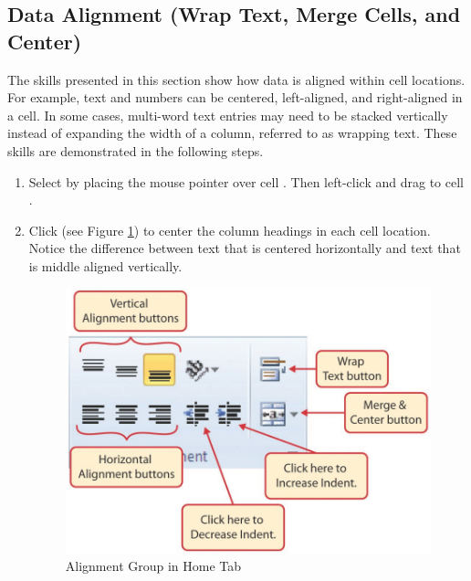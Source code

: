 \subsection{Data Alignment (Wrap Text, Merge Cells, and Center)}

The skills presented in this section show how data is aligned within cell locations. For example, text and numbers can be centered, left-aligned, and right-aligned in a cell. In some cases, multi-word text entries may need to be stacked vertically instead of expanding the width of a column, referred to as wrapping text. These skills are demonstrated in the following steps.

\begin{enumbox}
	\begin{enumerate}
		\item Select  by placing the mouse pointer over cell . Then left-click and drag to cell .
		\item Click  (see Figure \ref{01:fig38}) to center the column headings in each cell location. Notice the difference between text that is centered horizontally and text that is middle aligned vertically.
		
		\begin{figure}[H]
			\centering
			\includegraphics[width=\maxwidth{.95\linewidth}]{gfx/ch01_fig38}
			\caption{Alignment Group in Home Tab}
			\label{01:fig38}
		\end{figure}
		

\end{enumerate}
\end{enumbox}
